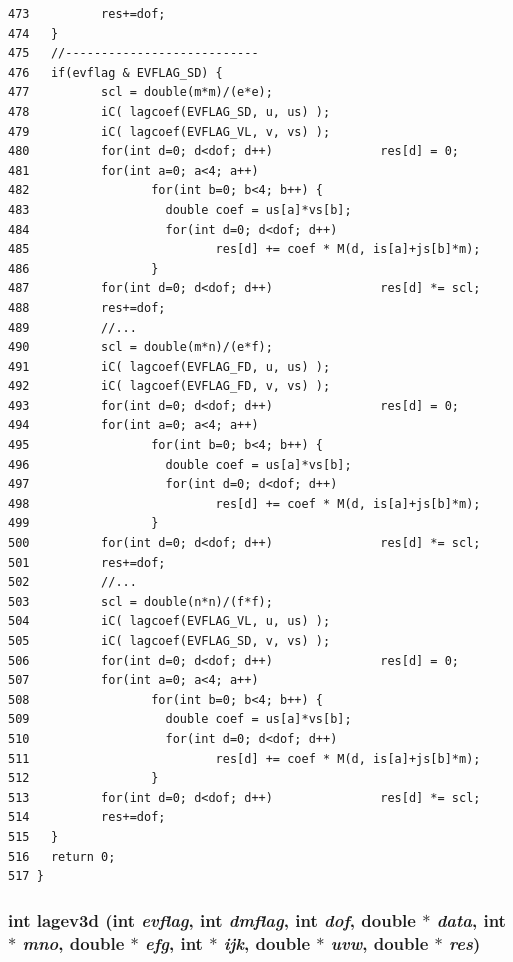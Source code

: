 \begin{verbatim}
473          res+=dof;
474   }
475   //---------------------------
476   if(evflag & EVFLAG_SD) {
477          scl = double(m*m)/(e*e);
478          iC( lagcoef(EVFLAG_SD, u, us) );
479          iC( lagcoef(EVFLAG_VL, v, vs) );
480          for(int d=0; d<dof; d++)               res[d] = 0;
481          for(int a=0; a<4; a++)
482                 for(int b=0; b<4; b++) {
483                   double coef = us[a]*vs[b]; 
484                   for(int d=0; d<dof; d++)
485                          res[d] += coef * M(d, is[a]+js[b]*m);
486                 }
487          for(int d=0; d<dof; d++)               res[d] *= scl;
488          res+=dof;
489          //...
490          scl = double(m*n)/(e*f);
491          iC( lagcoef(EVFLAG_FD, u, us) );
492          iC( lagcoef(EVFLAG_FD, v, vs) );
493          for(int d=0; d<dof; d++)               res[d] = 0;
494          for(int a=0; a<4; a++)
495                 for(int b=0; b<4; b++) {
496                   double coef = us[a]*vs[b]; 
497                   for(int d=0; d<dof; d++)
498                          res[d] += coef * M(d, is[a]+js[b]*m);
499                 }
500          for(int d=0; d<dof; d++)               res[d] *= scl;
501          res+=dof;
502          //...
503          scl = double(n*n)/(f*f);
504          iC( lagcoef(EVFLAG_VL, u, us) );
505          iC( lagcoef(EVFLAG_SD, v, vs) );
506          for(int d=0; d<dof; d++)               res[d] = 0;
507          for(int a=0; a<4; a++)
508                 for(int b=0; b<4; b++) {
509                   double coef = us[a]*vs[b]; 
510                   for(int d=0; d<dof; d++)
511                          res[d] += coef * M(d, is[a]+js[b]*m);
512                 }
513          for(int d=0; d<dof; d++)               res[d] *= scl;
514          res+=dof;
515   }
516   return 0;
517 }
\end{verbatim}\normalsize 


\subsubsection{\setlength{\rightskip}{0pt plus 5cm}int lagev3d (int {\em evflag}, int {\em dmflag}, int {\em dof}, double $\ast$ {\em data}, int $\ast$ {\em mno}, double $\ast$ {\em efg}, int $\ast$ {\em ijk}, double $\ast$ {\em uvw}, double $\ast$ {\em res})}\label{vecmatop_8cpp_39e9debd94c00b7012bdfe95bd592830_39e9debd94c00b7012bdfe95bd592830}




